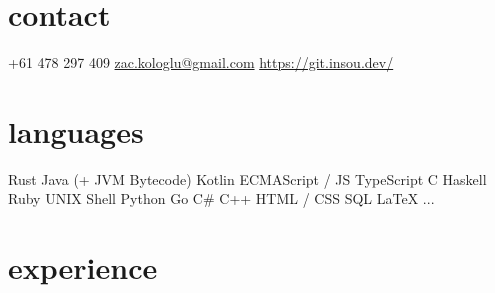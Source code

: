 \documentclass[]{cv-style}          %
\begin{document}
\lastupdated


\begin{aside}
%
\section{contact}
+61 478 297 409
\href{mailto:zac.kologlu@gmail.com}{zac.kologlu@gmail.com}
\href{https://git.insou.dev/}{https://git.insou.dev/}
\section{languages}
Rust
Java (+ JVM Bytecode)
Kotlin
ECMAScript / JS
TypeScript
C
Haskell
Ruby
UNIX Shell
Python
Go
C\#
C++
HTML / CSS
SQL
\LaTeX{}
...
%
\end{aside}


\section{experience}
\end{document}
